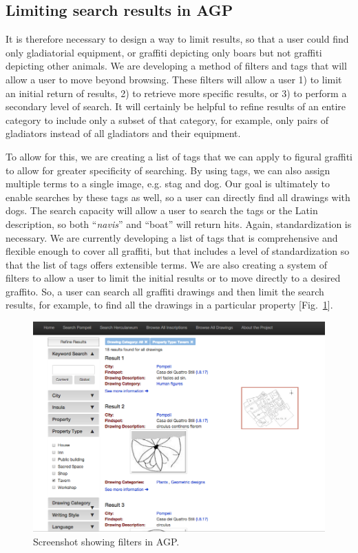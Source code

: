 \documentclass[amsthm,ebook]{saparticle}
\begin{document}
\subsection{Limiting search results in AGP}


\noindent It is therefore necessary to design a way to limit results, so that a user could find only gladiatorial equipment,
or graffiti depicting only boars but not graffiti depicting other animals. We are developing a method of filters and
tags that will allow a user to move beyond browsing. These filters will allow a user 1) to limit an initial return of
results, 2) to retrieve more specific results, or 3) to perform a secondary level of search. It will certainly be
helpful to refine results of an entire category to include only a subset of that category, for example, only pairs of
gladiators instead of all gladiators and their equipment.

To allow for this, we are creating a list of tags that we can apply to figural graffiti to allow for greater specificity
of searching. By using tags, we can also assign multiple terms to a single image, e.g. stag and dog. Our goal is
ultimately to enable searches by these tags as well, so a user can directly find all drawings with dogs. The search
capacity will allow a user to search the tags or the Latin description, so both ``\emph{navis}'' and ``boat'' will return hits.
Again, standardization is necessary. We are currently developing a list of tags that is comprehensive and flexible
enough to cover all graffiti, but that includes a level of standardization so that the list of tags offers extensible
terms. We are also creating a system of filters to allow a user to limit the initial results or to move directly to a
desired graffito. So, a user can search all graffiti drawings and then limit the search results, for example, to find
all the drawings in a particular property [Fig.~\ref{fig:9}].



\begin{figure}[!bp]
\centering
 \includegraphics[width=\columnwidth]{EAGLE2016BenefielSypniewski-img009.png}
\caption{Screenshot showing filters in AGP.}
\label{fig:9}
\end{figure}
\end{document}
